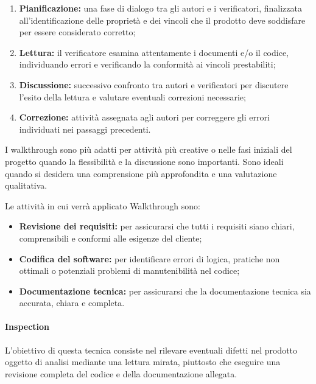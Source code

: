 \begin{enumerate}
    \item \textbf{Pianificazione:} 
        una fase di dialogo tra gli autori e i verificatori, finalizzata all'identificazione delle proprietà e dei vincoli che il prodotto deve soddisfare per essere considerato corretto; 

    \item \textbf{Lettura:} 
        il verificatore esamina attentamente i documenti e/o il codice, individuando errori e verificando la conformità ai vincoli prestabiliti; 

    \item \textbf{Discussione:} 
        successivo confronto tra autori e verificatori per discutere l'esito della lettura e valutare eventuali correzioni necessarie; 

    \item \textbf{Correzione:} 
        attività assegnata agli autori per correggere gli errori individuati nei passaggi precedenti.
\end{enumerate}

I walkthrough sono più adatti per attività più creative o nelle fasi iniziali del progetto quando la flessibilità e la discussione sono importanti. Sono ideali quando si desidera una comprensione più approfondita e una valutazione qualitativa. 

Le attività in cui verrà applicato Walkthrough sono:
\begin{itemize}
    \item \textbf{Revisione dei requisiti:} 
        per assicurarsi che tutti i requisiti siano chiari, comprensibili e conformi alle esigenze del cliente;
    \item \textbf{Codifica del software:} 
        per identificare errori di logica, pratiche non ottimali o potenziali problemi di manutenibilità nel codice;
    \item \textbf{Documentazione tecnica:} 
        per assicurarsi che la documentazione tecnica sia accurata, chiara e completa. 
\end{itemize}

\paragraph*{Inspection}
L'obiettivo di questa tecnica consiste nel rilevare eventuali difetti nel prodotto oggetto di analisi mediante una lettura mirata, piuttosto che eseguire una revisione completa del codice e della documentazione allegata. 

